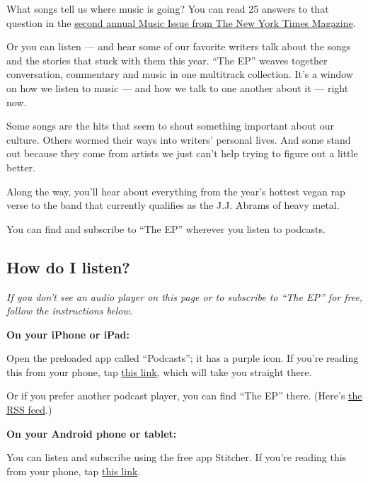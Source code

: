 What songs tell us where music is going? You can read 25 answers to that
question in the
\href{https://www.nytimes3xbfgragh.onion/interactive/2017/03/09/magazine/25-songs-that-tell-us-where-music-is-going.html}{second
annual Music Issue from The New York Times Magazine}.

Or you can listen --- and hear some of our favorite writers talk about
the songs and the stories that stuck with them this year. ``The EP''
weaves together conversation, commentary and music in one multitrack
collection. It's a window on how we listen to music --- and how we talk
to one another about it --- right now.

Some songs are the hits that seem to shout something important about our
culture. Others wormed their ways into writers' personal lives. And some
stand out because they come from artists we just can't help trying to
figure out a little better.

Along the way, you'll hear about everything from the year's hottest
vegan rap verse to the band that currently qualifies as the J.J. Abrams
of heavy metal.

You can find and subscribe to ``The EP'' wherever you listen to
podcasts.

\hypertarget{how-do-i-listen}{%
\subsection{How do I listen?}\label{how-do-i-listen}}

\emph{If you don't see an audio player on this page or to subscribe to
``The EP'' for free, follow the instructions below.}

\textbf{On your iPhone or iPad:}

Open the preloaded app called ``Podcasts''; it has a purple icon. If
you're reading this from your phone, tap
\href{https://geo.itunes.apple.com/us/podcast/the-ep-13-songs-that-capture-our-moment/id1213030309?mt=2}{this
link}, which will take you straight there.

Or if you prefer another podcast player, you can find ``The EP'' there.
(Here's \href{http://feeds.podtrac.com/tv8uQCHfz8e2}{the RSS feed}.)

\textbf{On your Android phone or tablet:}

You can listen and subscribe using the free app Stitcher. If you're
reading this from your phone, tap
\href{http://www.stitcher.com/podcast/the-new-york-times/the-ep-13-songs-that-capture-our-moment?refid=stpr}{this
link}.

